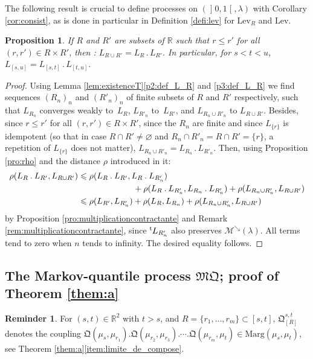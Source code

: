 \documentclass[10pt,a4paper]{article}
\providecommand{\Subsection}{\subsection}
\newcommand{\ldot}{\mathbin{.}}
\theoremstyle{plain}
\newtheorem{pro}[them]{Proposition}
\theoremstyle{definition}
\newtheorem{reminder}[them]{Reminder}
\newcommand{\como}{\mathfrak{Q}}
\newcommand{\mq}{\mathfrak{MQ}}
\newcommand{\lev}{\mathrm{Lev}}
\newcommand{\trans}{{}^{\mathrm{t}}\mkern-1mu}
\newcommand{\la}{\lambda}
\newcommand{\ma}{\mathrm{Marg}}
\newcommand{\R}{\mathbb{R}}
\newcommand{\mdec}{\mathcal{M}^{\scriptscriptstyle\searrow}}
\newcommand{\op}{\mathopen}
\newcommand{\clo}{\mathclose}
\begin{document}
The following result is crucial to define processes on $(\op]0,1\clo[,\la)$ with Corollary \ref{cor:consist}, as is done in particular in Definition \ref{defi:lev} for $\lev_R$ and $\lev$.
\begin{pro}\label{pro:compo}If $R$ and $R'$ are subsets of $\R$ such that $r\leqslant r'$ for all $(r,r')\in R\times R'$, then
: $L_{R\cup R'}=L_{R}{}\ldot L_{R'}$.
In particular, for $s<t<u$, $L_{[s,u]}=L_{[s,t]}{}\ldot L_{[t,u]}$.
\end{pro}
\begin{proof} Using Lemma \ref{lem:existenceT}\eqref{p2:def_L_R} and \eqref{p3:def_L_R} we find sequences $(R_n)_n$ and $(R'_n)_n$ of finite subsets of $R$ and $R'$ respectively, such that $L_{R_n}$ converges weakly to~$L_R$, $L_{R'_n}$ to~$L_{R'}$, and $L_{R_n\cup R'_n}$ to $L_{R\cup R'}$. Besides, since $r\leqslant r'$ for all $(r,r')\in R\times R'$, since the $R_n$ are finite and since $L_{\{r\}}$ is idempotent (so that in case $R\cap R'\neq\varnothing$ and $R_n\cap R'_n=R\cap R'=\{r\}$, a repetition of $L_{\{r\}}$ does not matter), $L_{R_n\cup R'_n}=L_{R_n}{}\ldot L_{R'_n}$. Then, using Proposition \ref{pro:rho} and the distance $\rho$ introduced in it:
\begin{align*}
\rho(L_R\ldot L_{R'},L_{R\cup R'})&\leqslant\rho(L_R\ldot L_{R'},L_R\ldot L_{R'_n})\\
&\hspace*{2.3cm}+\rho(L_R\ldot L_{R'_n},L_{R_n}{}\ldot L_{R'_n})+\rho(L_{R_n\cup R'_n},L_{R\cup R'})\\
&\leqslant\rho(L_{R'},L_{R'_n})+\rho(L_R,L_{R_n})+\rho(L_{R_n\cup R'_n},L_{R\cup R'})
\end{align*}
by Proposition \ref{pro:multiplicationcontractante} and Remark \ref{rem:multiplicationcontractante}, since $\trans{L_{R'_n}}$ also preserves $\mdec(\la)$. All terms tend to zero when $n$ tends to infinity. The desired equality follows.
\end{proof}

\Subsection{The Markov-quantile process $\mq$; proof of Theorem \ref{them:a}}\label{subsec:preuve_premier}

\begin{reminder} For $(s,t)\in\R^2$ with $t>s$, and $R=\{r_1,\ldots,r_m\}\subset[s,t]$, $\como^{s,t}_{[R]}$ denotes the coupling $\como(\mu_{s},\mu_{r_1}).\como(\mu_{r_2},\mu_{r_3}).\cdots.\como(\mu_{r_{m}},\mu_{t})\in\ma(\mu_s,\mu_t)$, see Theorem \ref{them:a}\eqref{item:limite_de_compose}.
\end{reminder}
\end{document}
